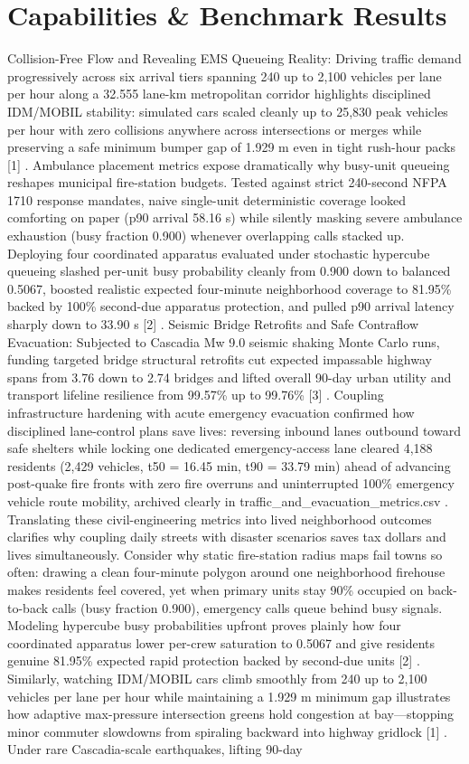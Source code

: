 \documentclass[10pt,letterpaper]{article}
\begin{document}
\section{Capabilities \& Benchmark Results}
Collision-Free Flow and Revealing EMS Queueing Reality: Driving traffic demand progressively across six arrival tiers spanning 240 up to 2,100 vehicles per lane per hour along a 32.555 lane-km metropolitan corridor highlights disciplined IDM/MOBIL stability: simulated cars scaled cleanly up to 25,830 peak vehicles per hour with zero collisions anywhere across intersections or merges while preserving a safe minimum bumper gap of 1.929 m even in tight rush-hour packs [1] . Ambulance placement metrics expose dramatically why busy-unit queueing reshapes municipal fire-station budgets. Tested against strict 240-second NFPA 1710 response mandates, naive single-unit deterministic coverage looked comforting on paper (p90 arrival 58.16 s) while silently masking severe ambulance exhaustion (busy fraction 0.900) whenever overlapping calls stacked up. Deploying four coordinated apparatus evaluated under stochastic hypercube queueing slashed per-unit busy probability cleanly from 0.900 down to balanced 0.5067, boosted realistic expected four-minute neighborhood coverage to 81.95\% backed by 100\% second-due apparatus protection, and pulled p90 arrival latency sharply down to 33.90 s [2] . Seismic Bridge Retrofits and Safe Contraflow Evacuation: Subjected to Cascadia Mw 9.0 seismic shaking Monte Carlo runs, funding targeted bridge structural retrofits cut expected impassable highway spans from 3.76 down to 2.74 bridges and lifted overall 90-day urban utility and transport lifeline resilience from 99.57\% up to 99.76\% [3] . Coupling infrastructure hardening with acute emergency evacuation confirmed how disciplined lane-control plans save lives: reversing inbound lanes outbound toward safe shelters while locking one dedicated emergency-access lane cleared 4,188 residents (2,429 vehicles, t50 = 16.45 min, t90 = 33.79 min) ahead of advancing post-quake fire fronts with zero fire overruns and uninterrupted 100\% emergency vehicle route mobility, archived clearly in traffic\_and\_evacuation\_metrics.csv . Translating these civil-engineering metrics into lived neighborhood outcomes clarifies why coupling daily streets with disaster scenarios saves tax dollars and lives simultaneously. Consider why static fire-station radius maps fail towns so often: drawing a clean four-minute polygon around one neighborhood firehouse makes residents feel covered, yet when primary units stay 90\% occupied on back-to-back calls (busy fraction 0.900), emergency calls queue behind busy signals. Modeling hypercube busy probabilities upfront proves plainly how four coordinated apparatus lower per-crew saturation to 0.5067 and give residents genuine 81.95\% expected rapid protection backed by second-due units [2] . Similarly, watching IDM/MOBIL cars climb smoothly from 240 up to 2,100 vehicles per lane per hour while maintaining a 1.929 m minimum gap illustrates how adaptive max-pressure intersection greens hold congestion at bay---stopping minor commuter slowdowns from spiraling backward into highway gridlock [1] . Under rare Cascadia-scale earthquakes, lifting 90-day 
\end{document}

